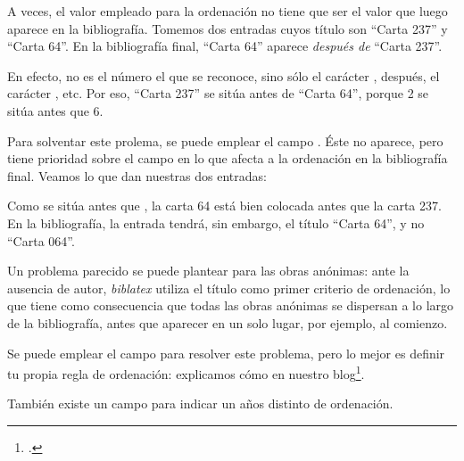 \begin{latexcode}
\usepackage[sorting=nyt]{biblatex}
\end{latexcode}

A veces, el valor empleado para la ordenación no tiene que ser el valor que luego aparece en la bibliografía. Tomemos dos entradas cuyos título son \enquote{Carta 237} y \enquote{Carta 64}. En la bibliografía final, 
\enquote{Carta 64} aparece \emph{después de} \enquote{Carta 237}. 

En efecto, no es el número  el que se reconoce, sino sólo el carácter , después, el carácter , etc. Por eso, \enquote{Carta 237} se sitúa antes de \enquote{Carta 64}, porque 2 se sitúa antes que 6.

Para solventar este prolema, se puede emplear el campo . Éste no aparece, pero tiene prioridad sobre el campo  en lo que afecta a la ordenación en la bibliografía final. Veamos lo que dan nuestras dos entradas:

\begin{latexcode}
@book{AugustinEpi64,
    Author = {Augustín},
    Sorttitle = {Carta 064},
    Title = {Carta 64}}
    
@book{AugustinEpi237,
    Author = {Augustín},
    Sorttitle = {Carta 237},
    Title = {Carta 237},
\end{latexcode}

Como  se sitúa antes que , la carta 64 está bien colocada antes que la carta 237. En la bibliografía, la entrada tendrá, sin embargo, el título \enquote{Carta 64}, y no \enquote{Carta 064}.

\begin{attention}
Un problema parecido se puede plantear para las obras anónimas: ante la ausencia de autor, \emph{biblatex} utiliza el título como primer criterio de ordenación, lo que tiene como consecuencia que todas las obras anónimas se dispersan a lo largo de la bibliografía, antes que aparecer en un solo lugar, por ejemplo, al comienzo.

Se puede emplear el campo  para resolver este problema, pero lo mejor es definir tu propia regla de ordenación: explicamos cómo en nuestro blog\footcite{trianonymes}.
\end{attention}


También existe un campo  para indicar un años distinto de ordenación. 
